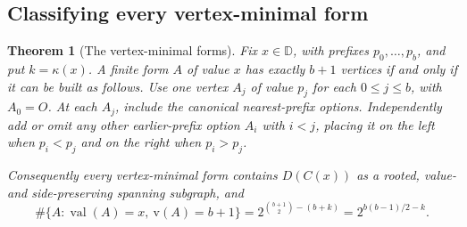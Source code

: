 \documentclass[11pt,a4paper]{article}
\numberwithin{equation}{section}
\newtheorem{theorem}{Theorem}[section]
\theoremstyle{definition}
\theoremstyle{remark}
\newcommand{\D}{\mathbb{D}}
\newcommand{\val}{\operatorname{val}}
\newcommand{\can}{C}
\newcommand{\sizeV}{\mathrm{v}}
\begin{document}
\subsection{Classifying every vertex-minimal form}

\begin{theorem}[The vertex-minimal forms]
\label{thm:minimal-forms}
Fix $x\in\D$, with prefixes $p_0,\ldots,p_b$, and put $k=\kappa(x)$.
A finite form $A$ of value $x$ has exactly $b+1$ vertices if and only if it can
be built as follows. Use one vertex $A_j$ of value $p_j$ for each $0\leq j\leq b$,
with $A_0=O$. At each $A_j$, include the canonical nearest-prefix options.
Independently add or omit any other earlier-prefix option $A_i$ with $i<j$,
placing it on the left when $p_i<p_j$ and on the right when $p_i>p_j$.

Consequently every vertex-minimal form contains $D(\can(x))$ as a rooted,
value- and side-preserving spanning subgraph, and
\begin{equation}
\label{eq:count-minimal}
 \#\{A:\val(A)=x,\ \sizeV(A)=b+1\}
 =2^{\binom{b+1}{2}-(b+k)}
 =2^{b(b-1)/2-k}.
\end{equation}
\end{theorem}
\end{document}
